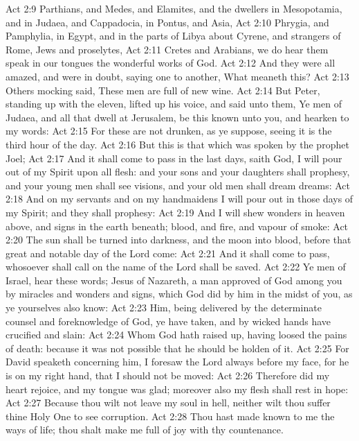 \vs Act 2:9 Parthians, and Medes, and Elamites, and the dwellers in Mesopotamia, and in Judaea, and Cappadocia, in Pontus, and Asia,
\vs Act 2:10 Phrygia, and Pamphylia, in Egypt, and in the parts of Libya about Cyrene, and strangers of Rome, Jews and proselytes,
\vs Act 2:11 Cretes and Arabians, we do hear them speak in our tongues the wonderful works of God.
\vs Act 2:12 And they were all amazed, and were in doubt, saying one to another, What meaneth this?
\vs Act 2:13 Others mocking said, These men are full of new wine.
\vs Act 2:14 But Peter, standing up with the eleven, lifted up his voice, and said unto them, Ye men of Judaea, and all  that dwell at Jerusalem, be this known unto you, and hearken to my words:
\vs Act 2:15 For these are not drunken, as ye suppose, seeing it is  the third hour of the day.
\vs Act 2:16 But this is that which was spoken by the prophet Joel;
\vs Act 2:17 And it shall come to pass in the last days, saith God, I will pour out of my Spirit upon all flesh: and your sons and your daughters shall prophesy, and your young men shall see visions, and your old men shall dream dreams:
\vs Act 2:18 And on my servants and on my handmaidens I will pour out in those days of my Spirit; and they shall prophesy:
\vs Act 2:19 And I will shew wonders in heaven above, and signs in the earth beneath; blood, and fire, and vapour of smoke:
\vs Act 2:20 The sun shall be turned into darkness, and the moon into blood, before that great and notable day of the Lord come:
\vs Act 2:21 And it shall come to pass,  whosoever shall call on the name of the Lord shall be saved.
\vs Act 2:22 Ye men of Israel, hear these words; Jesus of Nazareth, a man approved of God among you by miracles and wonders and signs, which God did by him in the midst of you, as ye yourselves also know:
\vs Act 2:23 Him, being delivered by the determinate counsel and foreknowledge of God, ye have taken, and by wicked hands have crucified and slain:
\vs Act 2:24 Whom God hath raised up, having loosed the pains of death: because it was not possible that he should be holden of it.
\vs Act 2:25 For David speaketh concerning him, I foresaw the Lord always before my face, for he is on my right hand, that I should not be moved:
\vs Act 2:26 Therefore did my heart rejoice, and my tongue was glad; moreover also my flesh shall rest in hope:
\vs Act 2:27 Because thou wilt not leave my soul in hell, neither wilt thou suffer thine Holy One to see corruption.
\vs Act 2:28 Thou hast made known to me the ways of life; thou shalt make me full of joy with thy countenance.
